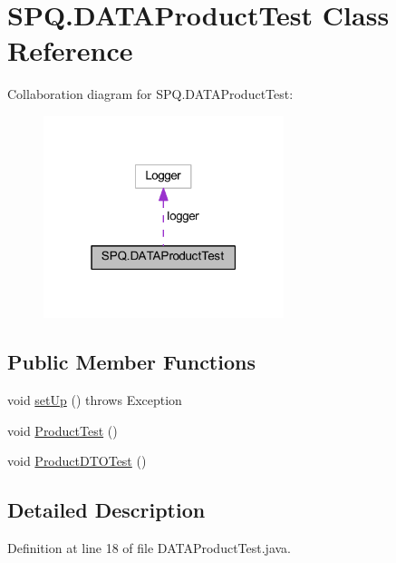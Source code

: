 \hypertarget{class_s_p_q_1_1_d_a_t_a_product_test}{}\section{S\+P\+Q.\+D\+A\+T\+A\+Product\+Test Class Reference}
\label{class_s_p_q_1_1_d_a_t_a_product_test}


Collaboration diagram for S\+P\+Q.\+D\+A\+T\+A\+Product\+Test\+:
\nopagebreak
\begin{figure}[H]
\begin{center}
\leavevmode
\includegraphics[width=199pt]{class_s_p_q_1_1_d_a_t_a_product_test__coll__graph}
\end{center}
\end{figure}
\subsection*{Public Member Functions}
\begin{DoxyCompactItemize}
\item 
void \mbox{\hyperlink{class_s_p_q_1_1_d_a_t_a_product_test_a64e9238fb4b99af0cdf55768230b4c89}{set\+Up}} ()  throws Exception 
\item 
void \mbox{\hyperlink{class_s_p_q_1_1_d_a_t_a_product_test_afb49da7389a7f4f42159adf87b4a11be}{Product\+Test}} ()
\item 
void \mbox{\hyperlink{class_s_p_q_1_1_d_a_t_a_product_test_a572f5f092c734feea3c7d8767b4a86c5}{Product\+D\+T\+O\+Test}} ()
\end{DoxyCompactItemize}


\subsection{Detailed Description}


Definition at line 18 of file D\+A\+T\+A\+Product\+Test.\+java.



